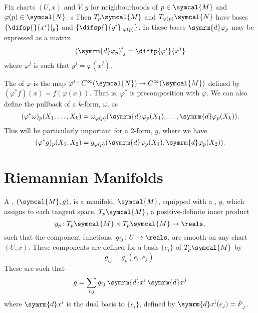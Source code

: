 \documentclass[fleqn]{NotesClass}
\newcommand{\manifold}{\symcal{M}}
\renewcommand{\dd}[1]{\,\symrm{d}#1}
\renewcommand{\dl}[1]{\symrm{d}#1}
\begin{document}
\begin{appendices}
        Fix charts \((U, x)\) and \(V, y\) for neighbourhoods of \(p \in \manifold\) and \(\varphi(p) \in \symcal{N}\). s
        Then \(T_p\manifold\) and \(T_{\varphi(p)}\symcal{N}\) have bases \(\{\difsp{}{x^i}|_p\}\) and \(\{\difsp{}{y^i}|_{\varphi(p)}\}\).
        In these bases \(\dl{\varphi_p}\) may be expressed as a matrix
        \begin{equation}
            \tensor{(\dl{\varphi_p})}{^i_j} = \diffp{\varphi^i}{x^j}
        \end{equation}
        where \(\varphi^j\) is such that \(y^j = \varphi(x^j)\).
        
        The  of \(\varphi\) is the map \(\varphi^* \colon C^{\infty}(\symcal{N}) \to C^{\infty}(\manifold)\) defined by \((\varphi^*f)(x) = f(\varphi(x))\).
        That is, \(\varphi^*\) is precomposition with \(\varphi\).
        We can also define the pullback of a \(k\)-form, \(\omega\), as
        \begin{equation}
            (\varphi^*\omega)_p(X_1, \dotsc, X_k) = \omega_{\varphi(p)}(\dl{\varphi_p}(X_1), \dotsc, \dl{\varphi_p}(X_k)).
        \end{equation}
        This will be particularly important for a 2-form, \(g\), where we have
        \begin{equation}
            (\varphi^*g)_p(X_1, X_2) = g_{\varphi(p)}(\dl{\varphi_p}(X_1), \dl{\varphi_p}(X_2)).
        \end{equation}
        
        
        \section{Riemannian Manifolds}
        A , \((\manifold, g)\), is a manifold, \(\manifold\), equipped with a , \(g\), which assigns to each tangent space, \(T_p\manifold\), a positive-definite inner product
        \begin{equation}
            g_p \colon T_p\manifold \times T_p\manifold \to \reals,
        \end{equation}
        such that the component functions, \(g_{ij} \colon U \to \reals\), are smooth on any chart \((U, x)\).
        These components are defined for a basis \(\{e_i\}\) of \(T_p\manifold\) by
        \begin{equation}
            g_{ij} = g_p(e_i, e_j).
        \end{equation}
        These are such that
        \begin{equation}
            g = \sum_{i,j} g_{ij} \dd{x^i} \dd{x^j}
        \end{equation}
        where \(\dl{x^i}\) is the dual basis to \(\{e_i\}\), defined by \(\dl{x^i}(e_j) = \tensor{\delta}{^{i}_j}\).
    \end{appendices}

\end{document}
